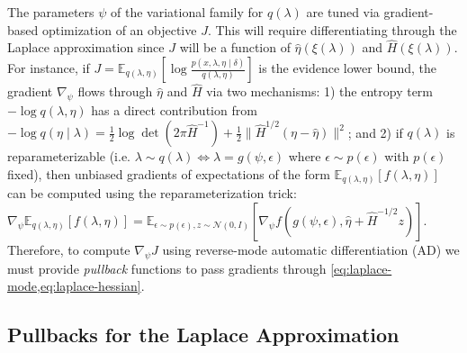 \documentclass{article}
\begin{document}
The parameters $\psi$ of the variational family for $q(\lambda)$ are tuned via gradient-based optimization of an objective $J$.
This will require differentiating through the Laplace approximation since $J$ will be a function of $\hat{\eta}(\xi(\lambda))$ and $\hat{H}(\xi(\lambda))$.
For instance, if $J = \mathbb{E}_{q(\lambda, \eta)} \left[\log \frac{p(x, \lambda, \eta \mid \delta)}{q(\lambda, \eta)}\right]$ is the evidence lower bound, the gradient $\nabla_\psi$ flows through $\hat{\eta}$ and $\hat{H}$ via two mechanisms:
1) the entropy term $-\log q(\lambda, \eta)$ has a direct contribution from $-\log q(\eta \mid \lambda) = \tfrac{1}{2}\log\det(2\pi\hat{H}^{-1}) + \tfrac{1}{2} \lVert \hat{H}^{1/2} (\eta - \hat{\eta}) \rVert^2$;
and 2) if $q(\lambda)$ is reparameterizable (i.e. $\lambda \sim q(\lambda) \Leftrightarrow \lambda = g(\psi, \epsilon)$ where $\epsilon \sim p(\epsilon)$ with $p(\epsilon)$ fixed), then unbiased gradients of expectations of the form $\mathbb{E}_{q(\lambda, \eta)}[f(\lambda, \eta)]$ can be computed using the reparameterization trick: $\nabla_\psi \mathbb{E}_{q(\lambda, \eta)}[f(\lambda, \eta)] = \mathbb{E}_{\epsilon \sim p(\epsilon), z \sim \mathcal{N}(0, I)}[\nabla_\psi f(g(\psi, \epsilon), \hat{\eta} + \hat{H}^{-1/2} z)]$.
Therefore, to compute $\nabla_\psi J$ using reverse-mode automatic differentiation (AD) we must provide \textit{pullback} functions to pass gradients through \cref{eq:laplace-mode,eq:laplace-hessian}.

\subsection{Pullbacks for the Laplace Approximation}
\end{document}
